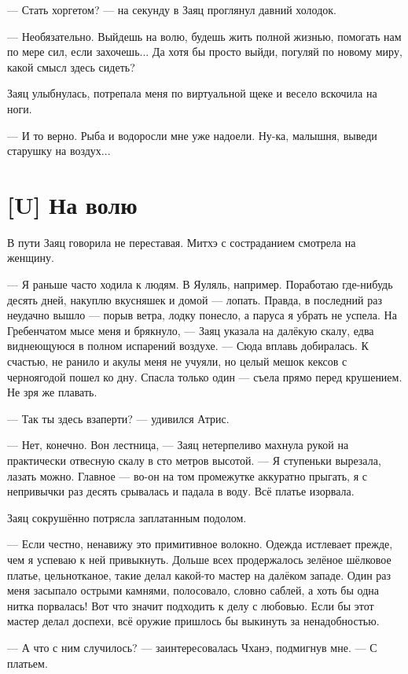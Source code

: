 --- Стать хоргетом? --- на секунду в Заяц проглянул давний холодок.

--- Необязательно.
Выйдешь на волю, будешь жить полной жизнью, помогать нам по мере сил, если захочешь...
Да хотя бы просто выйди, погуляй по новому миру, какой смысл здесь сидеть?

Заяц улыбнулась, потрепала меня по виртуальной щеке и весело вскочила на ноги.

--- И то верно.
Рыба и водоросли мне уже надоели.
Ну-ка, малышня, выведи старушку на воздух...

\section{[U] На волю}

В пути Заяц говорила не переставая.
Митхэ с состраданием смотрела на женщину.

--- Я раньше часто ходила к людям.
В Яуляль, например.
Поработаю где-нибудь десять дней, накуплю вкусняшек и домой --- лопать.
Правда, в последний раз неудачно вышло --- порыв ветра, лодку понесло, а паруса я убрать не успела.
На Гребенчатом мысе меня и брякнуло, --- Заяц указала на далёкую скалу, едва виднеющуюся в полном испарений воздухе.
--- Сюда вплавь добиралась.
К счастью, не ранило и акулы меня не учуяли, но целый мешок кексов с черноягодой пошел ко дну.
Спасла только один --- съела прямо перед крушением.
Не зря же плавать.

--- Так ты здесь взаперти? --- удивился Атрис.

--- Нет, конечно.
Вон лестница, --- Заяц нетерпеливо махнула рукой на практически отвесную скалу в сто метров высотой.
--- Я ступеньки вырезала, лазать можно.
Главное --- во-он на том промежутке аккуратно прыгать, я с непривычки раз десять срывалась и падала в воду.
Всё платье изорвала.

Заяц сокрушённо потрясла заплатанным подолом.

--- Если честно, ненавижу это примитивное волокно.
Одежда истлевает прежде, чем я успеваю к ней привыкнуть.
Дольше всех продержалось зелёное шёлковое платье, цельнотканое, такие делал какой-то мастер на далёком западе.
Один раз меня засыпало острыми камнями, полосовало, словно саблей, а хоть бы одна нитка порвалась!
Вот что значит подходить к делу с любовью.
Если бы этот мастер делал доспехи, всё оружие пришлось бы выкинуть за ненадобностью.

--- А что с ним случилось? --- заинтересовалась Чханэ, подмигнув мне.
--- С платьем.

